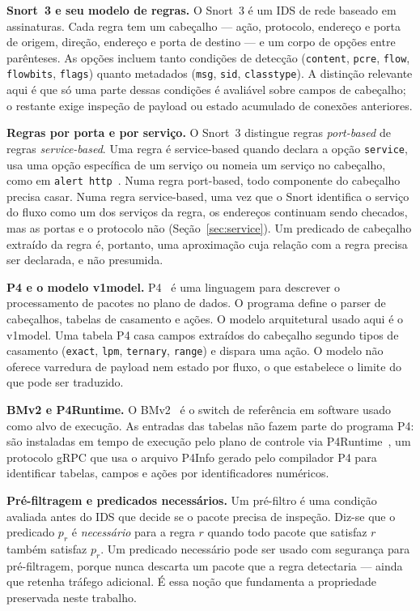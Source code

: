 \documentclass[11pt,a4paper]{article}
\begin{document}
\textbf{Snort~3 e seu modelo de regras.} O Snort~3 é um IDS de rede baseado em
assinaturas. Cada regra tem um cabeçalho --- ação, protocolo, endereço e porta
de origem, direção, endereço e porta de destino --- e um corpo de opções entre
parênteses. As opções incluem tanto condições de detecção (\texttt{content},
\texttt{pcre}, \texttt{flow}, \texttt{flowbits}, \texttt{flags}) quanto
metadados (\texttt{msg}, \texttt{sid}, \texttt{classtype}). A distinção
relevante aqui é que só uma parte dessas condições é avaliável sobre campos de
cabeçalho; o restante exige inspeção de payload ou estado acumulado de
conexões anteriores.

\textbf{Regras por porta e por serviço.} O Snort~3 distingue regras
\emph{port-based} de regras \emph{service-based}. Uma regra é service-based
quando declara a opção \texttt{service}, usa uma opção específica de um
serviço ou nomeia um serviço no cabeçalho, como em
\texttt{alert http}~\cite{snort3manual}. Numa regra port-based, todo
componente do cabeçalho precisa casar. Numa regra service-based, uma vez que o
Snort identifica o serviço do fluxo como um dos serviços da regra, os
endereços continuam sendo checados, mas as portas e o protocolo não
(Seção~\ref{sec:service}). Um predicado de cabeçalho extraído da regra é,
portanto, uma aproximação cuja relação com a regra precisa ser declarada, e
não presumida.

\textbf{P4 e o modelo v1model.} P4~\cite{p4spec2023} é uma linguagem para
descrever o processamento de pacotes no plano de dados. O programa define o
parser de cabeçalhos, tabelas de casamento e ações. O modelo arquitetural
usado aqui é o v1model. Uma tabela P4 casa campos extraídos do cabeçalho
segundo tipos de casamento (\texttt{exact}, \texttt{lpm}, \texttt{ternary},
\texttt{range}) e dispara uma ação. O modelo não oferece varredura de payload
nem estado por fluxo, o que estabelece o limite do que pode ser traduzido.

\textbf{BMv2 e P4Runtime.} O BMv2~\cite{bmv2} é o switch de referência em
software usado como alvo de execução. As entradas das tabelas não fazem parte
do programa P4: são instaladas em tempo de execução pelo plano de controle via
P4Runtime~\cite{p4runtime2024}, um protocolo gRPC que usa o arquivo P4Info
gerado pelo compilador P4 para identificar tabelas, campos e ações por
identificadores numéricos.

\textbf{Pré-filtragem e predicados necessários.} Um pré-filtro é uma condição
avaliada antes do IDS que decide se o pacote precisa de inspeção. Diz-se que o
predicado $p_r$ é \emph{necessário} para a regra $r$ quando todo pacote que
satisfaz $r$ também satisfaz $p_r$. Um predicado necessário pode ser usado com
segurança para pré-filtragem, porque nunca descarta um pacote que a regra
detectaria --- ainda que retenha tráfego adicional. É essa noção que
fundamenta a propriedade preservada neste trabalho.
\end{document}
